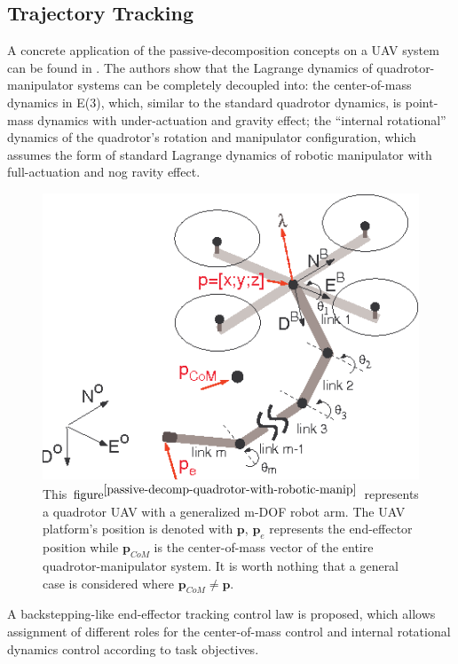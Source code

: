 \subsection{Trajectory Tracking}
A concrete application of the passive-decomposition concepts on a UAV system can be found in \cite{passive-decomp-quadrotor-with-robotic-manip}. The authors show that the Lagrange dynamics of quadrotor-manipulator systems can be completely decoupled into: the center-of-mass dynamics in E(3), which, similar to the standard quadrotor dynamics, is point-mass dynamics with under-actuation  and  gravity  effect; the  “internal rotational” dynamics  of  the  quadrotor’s  rotation  and  manipulator configuration, which assumes the form of standard Lagrange dynamics  of  robotic manipulator with full-actuation and nog ravity effect.  
\begin{figure}[H]
	\includegraphics[width=0.95\columnwidth]{figure/aerial_manip.png}	
	\centering
	\caption{This $\text{figure}^{\cite{passive-decomp-quadrotor-with-robotic-manip}}$ represents a quadrotor UAV with a generalized m-DOF robot arm. The UAV platform's position is denoted with $\textbf{p}$, $\textbf{p}_e$ represents the end-effector position while $\textbf{p}_{CoM}$ is the center-of-mass vector of the entire quadrotor-manipulator system. It is worth nothing that a general case is considered where $\textbf{p}_{CoM} \neq\textbf{p}$.  }
	\label{fig:aerial_manip}
\end{figure}
\noindent A backstepping-like end-effector tracking control law is proposed, which allows  assignment of different roles for the center-of-mass control and internal rotational dynamics  control according to task objectives.

